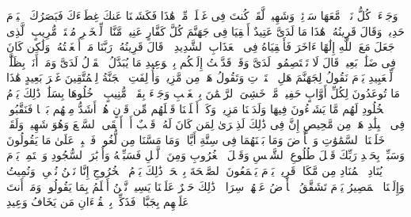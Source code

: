 \startbuffer[\q:50:21]
وَجَاۤءَتۡ كُلُّ نَفۡسࣲ مَّعَهَا سَاۤئِقࣱ وَشَهِیدࣱ%
\stopbuffer
\startbuffer[\q:50:22]
لَّقَدۡ كُنتَ فِی غَفۡلَةࣲ مِّنۡ هَٰذَا فَكَشَفۡنَا عَنكَ غِطَاۤءَكَ فَبَصَرُكَ ٱلۡیَوۡمَ حَدِیدࣱ%
\stopbuffer
\startbuffer[\q:50:23]
وَقَالَ قَرِینُهُۥ هَٰذَا مَا لَدَیَّ عَتِیدٌ%
\stopbuffer
\startbuffer[\q:50:24]
أَلۡقِیَا فِی جَهَنَّمَ كُلَّ كَفَّارٍ عَنِیدࣲ%
\stopbuffer
\startbuffer[\q:50:25]
مَّنَّاعࣲ لِّلۡخَیۡرِ مُعۡتَدࣲ مُّرِیبٍ%
\stopbuffer
\startbuffer[\q:50:26]
ٱلَّذِی جَعَلَ مَعَ ٱللَّهِ إِلَٰهًا ءَاخَرَ فَأَلۡقِیَاهُ فِی ٱلۡعَذَابِ ٱلشَّدِیدِ%
\stopbuffer
\startbuffer[\q:50:27]
۞ قَالَ قَرِینُهُۥ رَبَّنَا مَاۤ أَطۡغَیۡتُهُۥ وَلَٰكِن كَانَ فِی ضَلَٰلِۭ بَعِیدࣲ%
\stopbuffer
\startbuffer[\q:50:28]
قَالَ لَا تَخۡتَصِمُوا۟ لَدَیَّ وَقَدۡ قَدَّمۡتُ إِلَیۡكُم بِٱلۡوَعِیدِ%
\stopbuffer
\startbuffer[\q:50:29]
مَا یُبَدَّلُ ٱلۡقَوۡلُ لَدَیَّ وَمَاۤ أَنَا۠ بِظَلَّٰمࣲ لِّلۡعَبِیدِ%
\stopbuffer
\startbuffer[\q:50:30]
یَوۡمَ نَقُولُ لِجَهَنَّمَ هَلِ ٱمۡتَلَأۡتِ وَتَقُولُ هَلۡ مِن مَّزِیدࣲ%
\stopbuffer
\startbuffer[\q:50:31]
وَأُزۡلِفَتِ ٱلۡجَنَّةُ لِلۡمُتَّقِینَ غَیۡرَ بَعِیدٍ%
\stopbuffer
\startbuffer[\q:50:32]
هَٰذَا مَا تُوعَدُونَ لِكُلِّ أَوَّابٍ حَفِیظࣲ%
\stopbuffer
\startbuffer[\q:50:33]
مَّنۡ خَشِیَ ٱلرَّحۡمَٰنَ بِٱلۡغَیۡبِ وَجَاۤءَ بِقَلۡبࣲ مُّنِیبٍ%
\stopbuffer
\startbuffer[\q:50:34]
ٱدۡخُلُوهَا بِسَلَٰمࣲۖ ذَٰلِكَ یَوۡمُ ٱلۡخُلُودِ%
\stopbuffer
\startbuffer[\q:50:35]
لَهُم مَّا یَشَاۤءُونَ فِیهَا وَلَدَیۡنَا مَزِیدࣱ%
\stopbuffer
\startbuffer[\q:50:36]
وَكَمۡ أَهۡلَكۡنَا قَبۡلَهُم مِّن قَرۡنٍ هُمۡ أَشَدُّ مِنۡهُم بَطۡشࣰا فَنَقَّبُوا۟ فِی ٱلۡبِلَٰدِ هَلۡ مِن مَّحِیصٍ%
\stopbuffer
\startbuffer[\q:50:37]
إِنَّ فِی ذَٰلِكَ لَذِكۡرَىٰ لِمَن كَانَ لَهُۥ قَلۡبٌ أَوۡ أَلۡقَى ٱلسَّمۡعَ وَهُوَ شَهِیدࣱ%
\stopbuffer
\startbuffer[\q:50:38]
وَلَقَدۡ خَلَقۡنَا ٱلسَّمَٰوَٰتِ وَٱلۡأَرۡضَ وَمَا بَیۡنَهُمَا فِی سِتَّةِ أَیَّامࣲ وَمَا مَسَّنَا مِن لُّغُوبࣲ%
\stopbuffer
\startbuffer[\q:50:39]
فَٱصۡبِرۡ عَلَىٰ مَا یَقُولُونَ وَسَبِّحۡ بِحَمۡدِ رَبِّكَ قَبۡلَ طُلُوعِ ٱلشَّمۡسِ وَقَبۡلَ ٱلۡغُرُوبِ%
\stopbuffer
\startbuffer[\q:50:40]
وَمِنَ ٱلَّیۡلِ فَسَبِّحۡهُ وَأَدۡبَٰرَ ٱلسُّجُودِ%
\stopbuffer
\startbuffer[\q:50:41]
وَٱسۡتَمِعۡ یَوۡمَ یُنَادِ ٱلۡمُنَادِ مِن مَّكَانࣲ قَرِیبࣲ%
\stopbuffer
\startbuffer[\q:50:42]
یَوۡمَ یَسۡمَعُونَ ٱلصَّیۡحَةَ بِٱلۡحَقِّۚ ذَٰلِكَ یَوۡمُ ٱلۡخُرُوجِ%
\stopbuffer
\startbuffer[\q:50:43]
إِنَّا نَحۡنُ نُحۡیِۦ وَنُمِیتُ وَإِلَیۡنَا ٱلۡمَصِیرُ%
\stopbuffer
\startbuffer[\q:50:44]
یَوۡمَ تَشَقَّقُ ٱلۡأَرۡضُ عَنۡهُمۡ سِرَاعࣰاۚ ذَٰلِكَ حَشۡرٌ عَلَیۡنَا یَسِیرࣱ%
\stopbuffer
\startbuffer[\q:50:45]
نَّحۡنُ أَعۡلَمُ بِمَا یَقُولُونَۖ وَمَاۤ أَنتَ عَلَیۡهِم بِجَبَّارࣲۖ فَذَكِّرۡ بِٱلۡقُرۡءَانِ مَن یَخَافُ وَعِیدِ%
